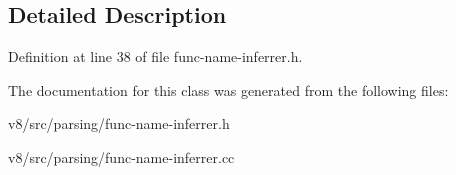 \subsection{Detailed Description}


Definition at line 38 of file func-\/name-\/inferrer.\+h.



The documentation for this class was generated from the following files\+:\begin{DoxyCompactItemize}
\item 
v8/src/parsing/func-\/name-\/inferrer.\+h\item 
v8/src/parsing/func-\/name-\/inferrer.\+cc\end{DoxyCompactItemize}
